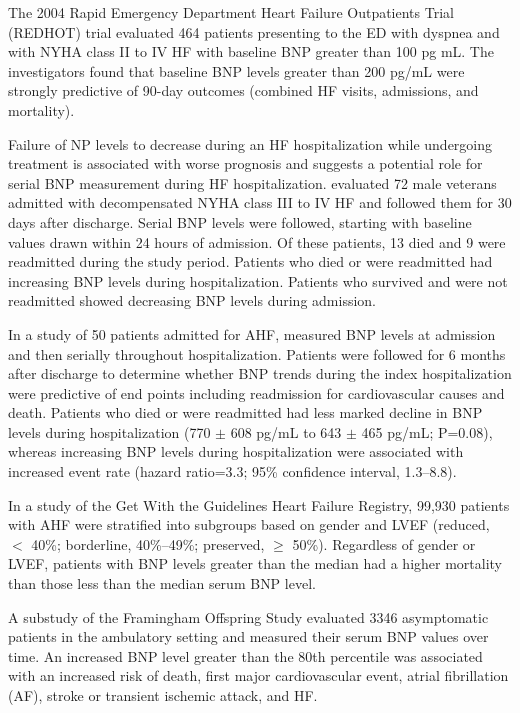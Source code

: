 \documentclass[14pt,a4paper,onecolumn]{extarticle}
\begin{document}
The 2004 Rapid Emergency Department Heart Failure Outpatients Trial (REDHOT) trial evaluated 464 patients presenting to the ED with dyspnea and with NYHA class II to IV HF with baseline BNP greater than 100 pg mL. The investigators found that baseline BNP levels greater than 200 pg/mL were strongly predictive of 90-day outcomes (combined HF visits, admissions, and mortality). \citep{Maisel2004} %

Failure of NP levels to decrease during an HF hospitalization while undergoing treatment is associated with worse prognosis and suggests a potential role for serial BNP measurement during HF hospitalization. \citep{Cheng2001} evaluated 72 male veterans admitted with decompensated NYHA class III to IV HF and followed them for 30 days after discharge. Serial BNP levels were followed, starting with baseline values drawn within 24 hours of admission. Of these patients, 13 died and 9 were readmitted during the study period. Patients who died or were readmitted had increasing BNP levels during hospitalization. Patients who survived and were not readmitted showed decreasing BNP levels during admission. \citep{Cheng2001} %

In a study of 50 patients admitted for AHF, \citep{Bettencourt2002} measured BNP levels at admission and then serially throughout hospitalization. Patients were followed for 6 months after discharge to determine whether BNP trends during the index hospitalization were predictive of end points including readmission for cardiovascular causes and death. Patients who died or were readmitted had less marked decline in BNP levels during hospitalization (770  $\pm$ 608 pg/mL to 643  $\pm$ 465 pg/mL; P=0.08), whereas increasing BNP levels during hospitalization were associated with increased event rate (hazard ratio=3.3; 95\% confidence interval, 1.3–8.8). %

In a study of the Get With the Guidelines Heart Failure Registry, 99,930 patients with AHF were stratified into subgroups based on gender and LVEF (reduced, $<$ 40\%; borderline, 40\%–49\%; preserved, $\geq$ 50\%). Regardless of gender or LVEF, patients with BNP levels greater than the median had a higher mortality than those less than the median serum BNP level. \citep{Hsich2013}  %

A substudy of the Framingham Offspring Study evaluated 3346 asymptomatic patients in the ambulatory setting and measured their serum BNP values over time. An increased BNP level greater than the 80th percentile was associated with an increased risk of death, first major cardiovascular event, atrial fibrillation (AF), stroke or transient ischemic attack, and HF. \citep{Wang2004c} %
\end{document}
